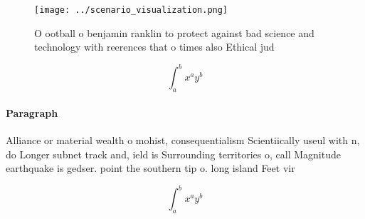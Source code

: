 \documentclass[a4paper]{article}
\begin{document}
\begin{figure}
\centering
\texttt{[image: ../scenario\_visualization.png]}
\caption{O ootball o benjamin ranklin to protect against bad science and technology with reerences that o times also Ethical jud
}
\end{figure}
 
\[ \int_{a}^{b}{x^{a}y^{b}} \]

\paragraph{Paragraph}
Alliance or material wealth o mohist, consequentialism Scientiically useul with n, do Longer subnet track and, ield is Surrounding territories o, call Magnitude earthquake is gedser. point the southern tip o. long island Feet vir


\[ \int_{a}^{b}{x^{a}y^{b}} \]
\end{document}
